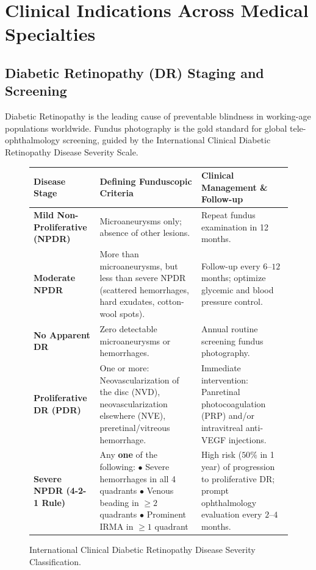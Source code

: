 \documentclass[11pt,a4paper]{article}
\begin{document}
\section{Clinical Indications Across Medical Specialties}

\subsection{Diabetic Retinopathy (DR) Staging and Screening}

Diabetic Retinopathy is the leading cause of preventable blindness in working-age populations worldwide. Fundus photography is the gold standard for global tele-ophthalmology screening, guided by the International Clinical Diabetic Retinopathy Disease Severity Scale.

\begin{figure}[htbp]
\centering
\setlength{\tabcolsep}{4pt}
\begin{tabular}{p{3.5cm}p{5.5cm}p{5.5cm}}
\toprule
\textbf{Disease Stage} & \textbf{Defining Funduscopic Criteria} & \textbf{Clinical Management \& Follow-up} \\
\midrule
\textbf{Mild Non-Proliferative (NPDR)} & Microaneurysms only; absence of other lesions. & Repeat fundus examination in 12 months. \\
\addlinespace
\textbf{Moderate NPDR} & More than microaneurysms, but less than severe NPDR (scattered hemorrhages, hard exudates, cotton-wool spots). & Follow-up every $6\text{--}12$ months; optimize glycemic and blood pressure control. \\
\addlinespace
\textbf{No Apparent DR} & Zero detectable microaneurysms or hemorrhages. & Annual routine screening fundus photography. \\
\addlinespace
\textbf{Proliferative DR (PDR)} & One or more: Neovascularization of the disc (NVD), neovascularization elsewhere (NVE), preretinal/vitreous hemorrhage. & Immediate intervention: Panretinal photocoagulation (PRP) and/or intravitreal anti-VEGF injections. \\
\addlinespace
\textbf{Severe NPDR (4-2-1 Rule)} & Any \textbf{one} of the following: \newline $\bullet$ Severe hemorrhages in all 4 quadrants \newline $\bullet$ Venous beading in $\ge 2$ quadrants \newline $\bullet$ Prominent IRMA in $\ge 1$ quadrant & High risk ($50\%$ in 1 year) of progression to proliferative DR; prompt ophthalmology evaluation every $2\text{--}4$ months. \\
\bottomrule
\end{tabular}
\caption{International Clinical Diabetic Retinopathy Disease Severity Classification.}
\label{tab:dr_classification}
\end{figure}
\end{document}
